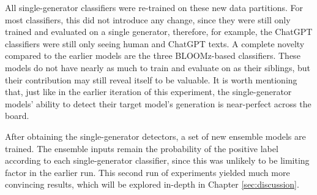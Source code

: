 All single-generator classifiers were re-trained on these new data partitions.
For most classifiers, this did not introduce any change, since they were still only trained and evaluated on a single generator, therefore, for example, the ChatGPT classifiers were still only seeing human and ChatGPT texts.
A complete novelty compared to the earlier models are the three BLOOMz-based classifiers.
These models do not have nearly as much to train and evaluate on as their siblings, but their contribution may still reveal itself to be valuable.
It is worth mentioning that, just like in the earlier iteration of this experiment, the single-generator models' ability to detect their target model's generation is near-perfect across the board.

After obtaining the single-generator detectors, a set of new ensemble models are trained.
The ensemble inputs remain the probability of the positive label according to each single-generator classifier, since this was unlikely to be limiting factor in the earlier run.
This second run of experiments yielded much more convincing results, which will be explored in-depth in Chapter \ref{sec:discussion}.